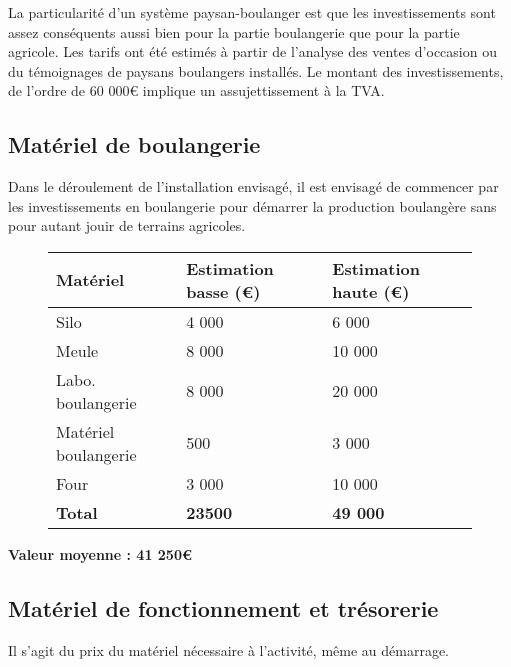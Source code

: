 \documentclass{article}
\begin{document}
La particularité d'un système paysan-boulanger est que les investissements sont assez conséquents aussi bien pour la partie boulangerie que pour la partie agricole. Les tarifs ont été estimés à partir de l'analyse des ventes d'occasion ou du témoignages de paysans boulangers installés. Le montant des investissements, de l'ordre de 60 000\euro{} implique un assujettissement à la TVA.

\subsection{Matériel de boulangerie}

Dans le déroulement de l'installation envisagé, il est envisagé de commencer par les investissements en boulangerie pour démarrer la production boulangère sans pour autant jouir de terrains agricoles.

\begin{figure}[h!]
\begin{center}
\begin{tabular}{|p{4cm}|p{3.5cm}|p{3.5cm}|}
\hline
 Matériel & Estimation basse (\euro{}) & Estimation haute (\euro{})\\
\hline
Silo & \hfill 4 000 & \hfill 6 000 \\
Meule & \hfill 8 000 & \hfill 10 000 \\
Labo. boulangerie & \hfill 8 000 & \hfill 20 000 \\ 
Matériel boulangerie & \hfill 500 & \hfill 3 000 \\
Four & \hfill 3 000 & \hfill 10 000 \\
\hline
\textbf{Total} & \hfill \textbf{23500} & \hfill \textbf{49 000}
\\
\hline
\end{tabular}
\end{center}
\label{sejour_semaine}
\end{figure}

\textbf{Valeur moyenne : 41 250\euro{}}

\subsection{Matériel de fonctionnement et trésorerie}

Il s'agit du prix du matériel nécessaire à l'activité, même au démarrage. 
\end{document}

